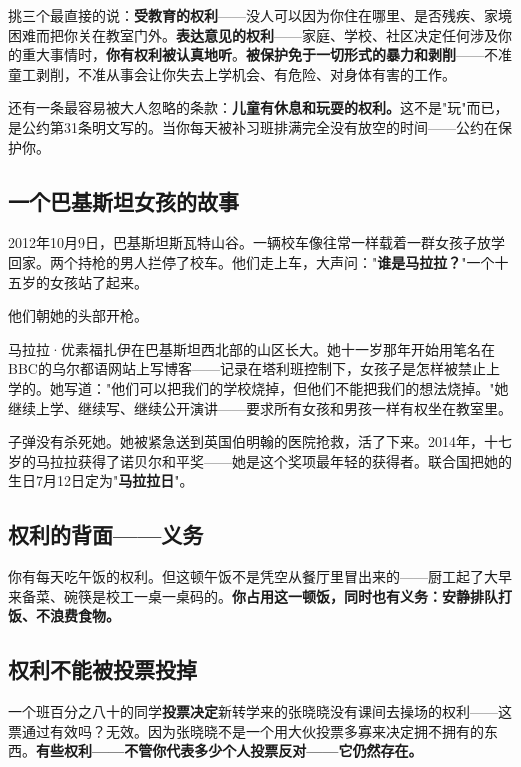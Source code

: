 \documentclass[a4paper,12pt]{ctexart}
\begin{document}
挑三个最直接的说：\textbf{受教育的权利}——没人可以因为你住在哪里、是否残疾、家境困难而把你关在教室门外。\textbf{表达意见的权利}——家庭、学校、社区决定任何涉及你的重大事情时，\textbf{你有权利被认真地听}。\textbf{被保护免于一切形式的暴力和剥削}——不准童工剥削，不准从事会让你失去上学机会、有危险、对身体有害的工作。

还有一条最容易被大人忽略的条款：\textbf{儿童有休息和玩耍的权利。}这不是"玩"而已，是公约第31条明文写的。当你每天被补习班排满完全没有放空的时间——公约在保护你。

\subsection*{一个巴基斯坦女孩的故事}

2012年10月9日，巴基斯坦斯瓦特山谷。一辆校车像往常一样载着一群女孩子放学回家。两个持枪的男人拦停了校车。他们走上车，大声问："\textbf{谁是马拉拉？}"一个十五岁的女孩站了起来。

他们朝她的头部开枪。

马拉拉·优素福扎伊在巴基斯坦西北部的山区长大。她十一岁那年开始用笔名在BBC的乌尔都语网站上写博客——记录在塔利班控制下，女孩子是怎样被禁止上学的。她写道："他们可以把我们的学校烧掉，但他们不能把我们的想法烧掉。"她继续上学、继续写、继续公开演讲——要求所有女孩和男孩一样有权坐在教室里。

子弹没有杀死她。她被紧急送到英国伯明翰的医院抢救，活了下来。2014年，十七岁的马拉拉获得了诺贝尔和平奖——她是这个奖项最年轻的获得者。联合国把她的生日7月12日定为"\textbf{马拉拉日}"。

\subsection*{权利的背面——义务}

你有每天吃午饭的权利。但这顿午饭不是凭空从餐厅里冒出来的——厨工起了大早来备菜、碗筷是校工一桌一桌码的。\textbf{你占用这一顿饭，同时也有义务：安静排队打饭、不浪费食物。}

\subsection*{权利不能被投票投掉}

一个班百分之八十的同学\textbf{投票决定}新转学来的张晓晓没有课间去操场的权利——这票通过有效吗？无效。因为张晓晓不是一个用大伙投票多寡来决定拥不拥有的东西。\textbf{有些权利——不管你代表多少个人投票反对——它仍然存在。}

\end{document}
